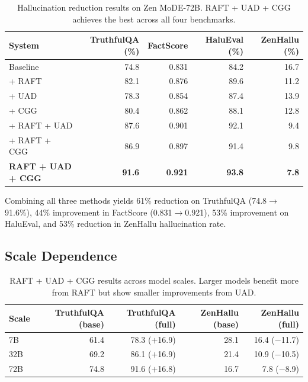 \documentclass[11pt,a4paper]{article}
\begin{document}
\begin{table}[H]
\centering
\caption{Hallucination reduction results on Zen MoDE-72B. RAFT + UAD + CGG achieves
the best across all four benchmarks.}
\begin{tabular}{lrrrr}
\toprule
\textbf{System} & \textbf{TruthfulQA (\%)} & \textbf{FactScore} & \textbf{HaluEval (\%)} & \textbf{ZenHallu (\%)} \\
\midrule
Baseline               & 74.8 & 0.831 & 84.2 & 16.7 \\
+ RAFT                 & 82.1 & 0.876 & 89.6 & 11.2 \\
+ UAD                  & 78.3 & 0.854 & 87.4 & 13.9 \\
+ CGG                  & 80.4 & 0.862 & 88.1 & 12.8 \\
+ RAFT + UAD           & 87.6 & 0.901 & 92.1 & 9.4  \\
+ RAFT + CGG           & 86.9 & 0.897 & 91.4 & 9.8  \\
\textbf{RAFT + UAD + CGG} & \textbf{91.6} & \textbf{0.921} & \textbf{93.8} & \textbf{7.8} \\
\bottomrule
\end{tabular}
\label{tab:main_results}
\end{table}

Combining all three methods yields 61\% reduction on TruthfulQA (74.8$\to$91.6\%), 44\%
improvement in FactScore (0.831$\to$0.921), 53\% improvement on HaluEval, and 53\%
reduction in ZenHallu hallucination rate.

\subsection{Scale Dependence}

\begin{table}[H]
\centering
\caption{RAFT + UAD + CGG results across model scales. Larger models benefit more from
RAFT but show smaller improvements from UAD.}
\begin{tabular}{lrrrr}
\toprule
\textbf{Scale} & \textbf{TruthfulQA (base)} & \textbf{TruthfulQA (full)} & \textbf{ZenHallu (base)} & \textbf{ZenHallu (full)} \\
\midrule
7B  & 61.4 & 78.3 ($+$16.9) & 28.1 & 16.4 ($-$11.7) \\
32B & 69.2 & 86.1 ($+$16.9) & 21.4 & 10.9 ($-$10.5) \\
72B & 74.8 & 91.6 ($+$16.8) & 16.7 & 7.8  ($-$8.9) \\
\bottomrule
\end{tabular}
\label{tab:scale}
\end{table}
\end{document}

